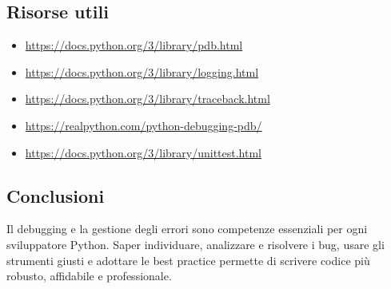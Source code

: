 \documentclass[a4paper,12pt]{article}
\begin{document}
\subsection*{Risorse utili}
\begin{itemize}
    \item \url{https://docs.python.org/3/library/pdb.html}
    \item \url{https://docs.python.org/3/library/logging.html}
    \item \url{https://docs.python.org/3/library/traceback.html}
    \item \url{https://realpython.com/python-debugging-pdb/}
    \item \url{https://docs.python.org/3/library/unittest.html}
\end{itemize}

\subsection*{Conclusioni}
Il debugging e la gestione degli errori sono competenze essenziali per ogni sviluppatore Python. Saper individuare, analizzare e risolvere i bug, usare gli strumenti giusti e adottare le best practice permette di scrivere codice più robusto, affidabile e professionale.
\end{document}
